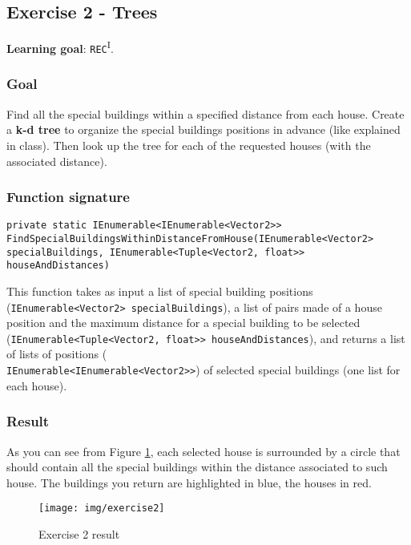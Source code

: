 \newpage
\subsection*{Exercise 2 - Trees}
\textbf{Learning goal}: \texttt{REC}\textsuperscript{I}. \\

\subsubsection*{Goal}
Find all the special buildings within a specified distance from each house. Create a \textbf{k-d tree} to organize the special buildings positions in advance (like explained in class). Then look up the tree for each of the requested houses (with the associated distance).

\subsubsection*{Function signature} 
\begin{lstlisting}
private static IEnumerable<IEnumerable<Vector2>> FindSpecialBuildingsWithinDistanceFromHouse(IEnumerable<Vector2> specialBuildings, IEnumerable<Tuple<Vector2, float>> houseAndDistances)
\end{lstlisting}

\noindent
This function takes as input a list of special building positions (\texttt{IEnumerable<Vector2> specialBuildings}), a list of pairs made of a house position and the maximum distance for a special building to be selected (\texttt{IEnumerable<Tuple<Vector2, float>> houseAndDistances}), and returns a list of lists of positions (\\ \texttt{IEnumerable<IEnumerable<Vector2>>}) of selected special buildings (one list for each house).\\

\subsubsection*{Result}
As you can see from Figure \ref{img:Ex2}, each selected house is surrounded by a circle that should contain all the special buildings within the distance associated to such house. The buildings you return are highlighted in blue, the houses in red.

\begin{figure}[!h]
\centering
\texttt{[image: img/exercise2]}
\caption{Exercise 2 result}
\label{img:Ex2}
\end{figure}


